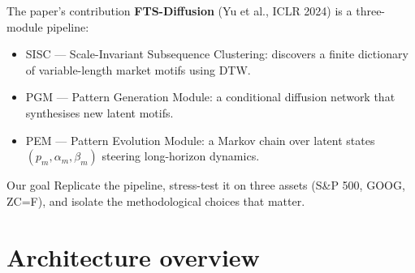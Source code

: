 \documentclass[11pt,aspectratio=169]{beamer}
\begin{document}
\begin{frame}{The paper's contribution}
  \textbf{FTS-Diffusion} (Yu et al., ICLR 2024) is a three-module pipeline:
  \begin{itemize}
    \item \alert{SISC} --- Scale-Invariant Subsequence Clustering: discovers a finite dictionary of variable-length market motifs using DTW.
    \item \alert{PGM} --- Pattern Generation Module: a conditional diffusion network that synthesises new latent motifs.
    \item \alert{PEM} --- Pattern Evolution Module: a Markov chain over latent states $(p_m,\alpha_m,\beta_m)$ steering long-horizon dynamics.
  \end{itemize}
  \medskip
  \begin{exampleblock}{Our goal}
    Replicate the pipeline, stress-test it on three assets (S\&P 500, GOOG, ZC=F),
    and isolate the methodological choices that matter.
  \end{exampleblock}
\end{frame}

\section{Architecture overview}
\end{document}
